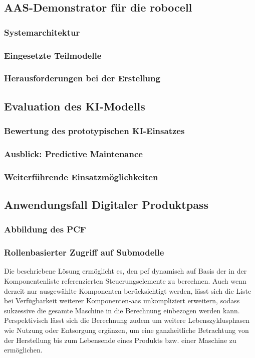 \subsection{AAS-Demonstrator für die robocell}
\subsubsection{Systemarchitektur}
\subsubsection{Eingesetzte Teilmodelle}
\subsubsection{Herausforderungen bei der Erstellung}

\subsection{Evaluation des KI-Modells}
\subsubsection{Bewertung des prototypischen KI-Einsatzes}
\subsubsection{Ausblick: Predictive Maintenance}
\subsubsection{Weiterführende Einsatzmöglichkeiten}

\subsection{Anwendungsfall Digitaler Produktpass}
\subsubsection{Abbildung des PCF}
\subsubsection{Rollenbasierter Zugriff auf Submodelle}

Die beschriebene Lösung ermöglicht es, den \acs{pcf} dynamisch auf Basis der in der Komponentenliste referenzierten Steuerungselemente zu berechnen. 
Auch wenn derzeit nur ausgewählte Komponenten berücksichtigt werden, lässt sich die Liste bei Verfügbarkeit weiterer Komponenten-\acs{aas} unkompliziert erweitern, sodass sukzessive die gesamte Maschine in die Berechnung einbezogen werden kann. 
Perspektivisch lässt sich die Berechnung zudem um weitere Lebenszyklusphasen wie Nutzung oder Entsorgung ergänzen, um eine ganzheitliche Betrachtung von der Herstellung bis zum Lebensende eines Produkts bzw. einer Maschine zu ermöglichen.


